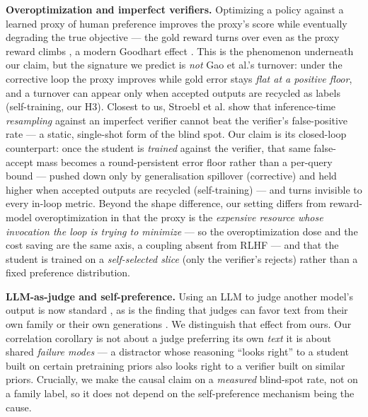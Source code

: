 \documentclass[11pt]{article}
\begin{document}
\textbf{Overoptimization and imperfect verifiers.} Optimizing a policy
against a learned proxy of human preference improves the proxy's score
while eventually degrading the true objective --- the gold reward turns
over even as the proxy reward climbs
\cite{gao2023scaling,skalse2022reward}, a modern Goodhart effect
\cite{manheim2018goodhart}. This is the phenomenon underneath our claim,
but the signature we predict is \emph{not} Gao et al.'s turnover: under
the corrective loop the proxy improves while gold error stays \emph{flat
at a positive floor}, and a turnover can appear only when accepted
outputs are recycled as labels (self-training, our H3). Closest to us,
Stroebl et al. \cite{stroebl2024inference} show that inference-time
\emph{resampling} against an imperfect verifier cannot beat the
verifier's false-positive rate --- a static, single-shot form of the
blind spot. Our claim is its closed-loop counterpart: once the student
is \emph{trained} against the verifier, that same false-accept mass
becomes a round-persistent error floor rather than a per-query bound ---
pushed down only by generalisation spillover (corrective) and held
higher when accepted outputs are recycled (self-training) --- and turns
invisible to every in-loop metric. Beyond the shape difference, our
setting differs from reward-model overoptimization in that the proxy is
the \emph{expensive resource whose invocation the loop is trying to
minimize} --- so the overoptimization dose and the cost saving are the
same axis, a coupling absent from RLHF --- and that the student is
trained on a \emph{self-selected slice} (only the verifier's rejects)
rather than a fixed preference distribution.

\textbf{LLM-as-judge and self-preference.} Using an LLM to judge another
model's output is now standard \cite{zheng2023judging}, as is the finding
that judges can favor text from their own family or their own
generations \cite{panickssery2024selfpreference}. We distinguish that
effect from ours. Our correlation corollary is not about a judge
preferring its own \emph{text} it is about shared \emph{failure modes}
--- a distractor whose reasoning ``looks right'' to a student built on
certain pretraining priors also looks right to a verifier built on
similar priors. Crucially, we make the causal claim on a \emph{measured}
blind-spot rate, not on a family label, so it does not depend on the
self-preference mechanism being the cause.
\end{document}
